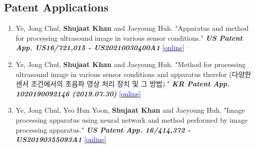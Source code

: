 \small
\subsection*{Patent Applications}
    \begin{enumerate}
    \item Ye, Jong Chul, \textbf{Shujaat Khan} and Jaeyoung Huh. "Apparatus and method for processing ultrasound image in various sensor conditions." \textit{\textbf{US Patent App. US16/721,015 - US20210030400A1}} \href{https://patents.google.com/patent/US20210030400A1/en}{[\textcolor{blue}{online}]}
    
    \item Ye, Jong Chul, \textbf{Shujaat Khan} and Jaeyoung Huh. "Method for processing ultrasound image in various sensor conditions and apparatus therefor (다양한 센서 조건에서의 초음파 영상 처리 장치 및 그 방법)." \textit{\textbf{KR Patent App. 1020190092146 (2019.07.30)}} \href{https://doi.org/10.8080/1020190092146?urlappend=en}{[\textcolor{blue}{online}]}
    
    \item Ye, Jong Chul, Yeo Hun Yoon, \textbf{Shujaat Khan} and Jaeyoung Huh. "Image processing apparatus using neural network and method performed by image processing apparatus." \textit{\textbf{US Patent App. 16/414,372 - US20190355093A1}} \href{https://patents.google.com/patent/US20190355093A1/en}{[\textcolor{blue}{online}]}
    \end{enumerate}

